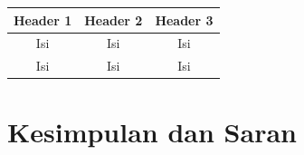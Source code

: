 \documentclass[a4paper,10pt]{article}
\newcommand{\SDS}{\renewcommand{\baselinestretch}{1}\tiny \normalsize }
\begin{document}
\begin{body}
\begin{tablehere}
\begin{center}
\begin{tabular}{|c|c|c|}
\hline
Header 1 & Header 2 & Header 3 \\ 
\hline
Isi & Isi & Isi \\ 
\hline
Isi & Isi & Isi \\
\hline
\end{tabular}
\end{center}

\end{tablehere}

\section{Kesimpulan dan Saran}
\lipsum[90-91]

\cite{book1, book2, skripsi, tesis, disertasi, kp, article1, proceeding1, penelitian, dokteknama, dokteknonama, majalah1, majalah2, web1, web2, presentasi, diktat,komprivat}

\SDS


\end{body}
\end{document}
